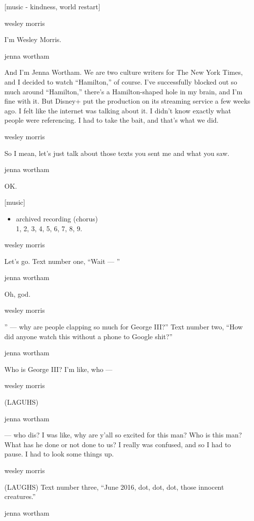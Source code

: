{[}music - kindness, world restart{]}

wesley morris

I'm Wesley Morris.

jenna wortham

And I'm Jenna Wortham. We are two culture writers for The New York
Times, and I decided to watch ``Hamilton,'' of course. I've successfully
blocked out so much around ``Hamilton,'' there's a Hamilton-shaped hole
in my brain, and I'm fine with it. But Disney+ put the production on its
streaming service a few weeks ago. I felt like the internet was talking
about it. I didn't know exactly what people were referencing. I had to
take the bait, and that's what we did.

wesley morris

So I mean, let's just talk about those texts you sent me and what you
saw.

jenna wortham

OK.

{[}music{]}

\begin{itemize}
\tightlist
\item
  archived recording (chorus)\\
  1, 2, 3, 4, 5, 6, 7, 8, 9.
\end{itemize}

wesley morris

Let's go. Text number one, ``Wait --- ''

jenna wortham

Oh, god.

wesley morris

'' --- why are people clapping so much for George III?'' Text number
two, ``How did anyone watch this without a phone to Google shit?''

jenna wortham

Who is George III? I'm like, who ---

wesley morris

(LAGUHS)

jenna wortham

--- who dis? I was like, why are y'all so excited for this man? Who is
this man? What has he done or not done to us? I really was confused, and
so I had to pause. I had to look some things up.

wesley morris

(LAUGHS) Text number three, ``June 2016, dot, dot, dot, those innocent
creatures.''

jenna wortham

